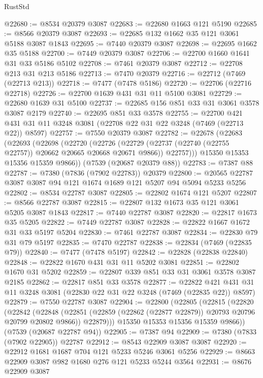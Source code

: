 \begin{lexlean}{RustStd}
\begin{coremodule}
@22680 := @8534 @20379 @3087
@22683 := @22680 @1663 @121 @5190
@22685 := @8566 @20379 @3087
@22693 := @22685 @132 @1662 @35 @121 @3061 @5188 @3087 @1843
@22695 := @7440 @20379 @3087
@22698 := @22695 @1662 @35 @5188
@22700 := @7449 @20379 @3087
@22706 := @22700 @1660 @1641 @31 @33 @5186 @5102
@22708 := @7461 @20379 @3087
@22712 := @22708 @213 @31 @213 @5186
@22713 := @7470 @20379
@22716 := @22712 (@7469 (@22713 @213))
@22718 := @7477 (@7478 @5186)
@22720 := @22706 (@22716 @22718)
@22726 := @22700 @1639 @431 @31 @11 @5100 @3081
@22729 := @22680 @1639 @31 @5100
@22737 := @22685 @156 @851 @33 @31 @3061 @3578 @3087 @2179
@22740 := @22695 @851 @33 @3578
@22755 := @22700 @421 @431 @31 @11 @3248 @3081 (@22708 @22 @31 @22 @3248 (@7469 (@22713 @22)) @8597)
@22757 := @7550 @20379 @3087
@22782 := @22678
    (@22683
      (@22693
        (@22698
          (@22720
            (@22726
              (@22729 (@22737 (@22740 (@22755 @22757)) @20662 @20665 @20668 @20671 @9866))
              @22757)))
        @15350
        @15353
        @15356
        @15359
        @9866))
    (@7539 (@20687 @20379 @88))
@22783 := @7387 @88
@22787 := @7380 (@7836 (@7902 @22783)) @20379
@22800 := @20565 @22787 @3087 @3087 @94 @121 @1674 @1689 @121 @5207 @94 @5094 @5233 @5256
@22802 := @8534 @22787 @3087
@22805 := @22802 @1674 @121 @5207
@22807 := @8566 @22787 @3087
@22815 := @22807 @132 @1673 @35 @121 @3061 @5205 @3087 @1843
@22817 := @7440 @22787 @3087
@22820 := @22817 @1673 @35 @5205
@22822 := @7449 @22787 @3087
@22828 := @22822 @1667 @1672 @31 @33 @5197 @5204
@22830 := @7461 @22787 @3087
@22834 := @22830 @79 @31 @79 @5197
@22835 := @7470 @22787
@22838 := @22834 (@7469 (@22835 @79))
@22840 := @7477 (@7478 @5197)
@22842 := @22828 (@22838 @22840)
@22848 := @22822 @1670 @431 @31 @11 @5202 @3081
@22851 := @22802 @1670 @31 @5202
@22859 := @22807 @339 @851 @33 @31 @3061 @3578 @3087 @2185
@22862 := @22817 @851 @33 @3578
@22877 := @22822 @421 @431 @31 @11 @3248 @3081 (@22830 @22 @31 @22 @3248 (@7469 (@22835 @22)) @8597)
@22879 := @7550 @22787 @3087
@22904 := @22800
    (@22805
      (@22815
        (@22820
          (@22842
            (@22848
              (@22851 (@22859 (@22862 (@22877 @22879)) @20793 @20796 @20799 @20802 @9866))
              @22879)))
        @15350
        @15353
        @15356
        @15359
        @9866))
    (@7539 (@20687 @22787 @94))
@22905 := @7387 @94
@22909 := @7380 (@7833 (@7902 @22905)) @22787
@22912 := @8543 @22909 @3087 @3087
@22920 := @22912 @1681 @1687 @704 @121 @5233 @5246 @3061 @5256
@22929 := @8663 @22909 @3087 @982 @1680 @276 @121 @5233 @5244 @3564
@22931 := @8676 @22909 @3087

\end{coremodule}
\end{lexlean}
